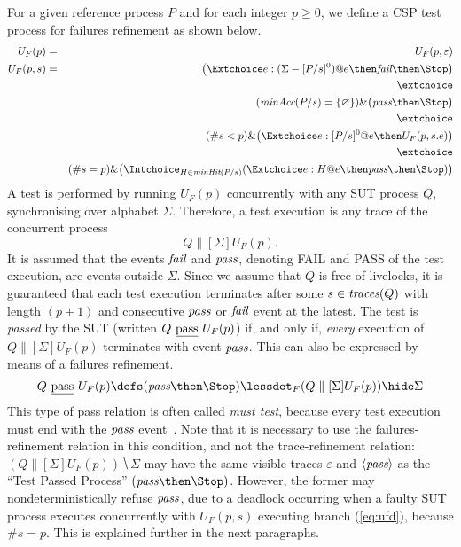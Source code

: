 For a given reference process $P$ and for each integer $p\ge 0$, we define a
CSP test process for failures refinement as shown below.
%
\begin{eqnarray}
U_F(p) & = & U_F(p,\varepsilon)
\\
U_F(p,s) & = & \big( \Extchoice e:(\Sigma - [P/s]^0) @ e \then \efail\then \Stop \big)
\label{eq:ufa}
\\ & & \extchoice \nonumber
\\ & & (\minaccs(P/s) = \{ \varnothing \})    \&   \big( \epass \then \Stop \big)
\label{eq:ufb}
\\ & & \extchoice \nonumber
\\ & & (\#s < p) \& \big( \Extchoice e:[P/s]^0 @ e \then U_F(p,s.e) \big)
\label{eq:ufc}
\\ & & \extchoice \nonumber
\\ & & (\#s = p ) \& \big( \Intchoice_{H\in\minhits(P/s)} ( \Extchoice e:H @ e \then \epass \then\Stop   )  \big)
\label{eq:ufd}
\end{eqnarray}
%
A test is performed by running $U_F(p)$ concurrently with any SUT process $Q$,
synchronising over alphabet $\Sigma$. Therefore, a test execution is any
trace of the concurrent process
\[
Q\parallel[\Sigma] U_F(p).
\]
It is assumed that the events ${\text{\it fail}}$ and ${\text{\it pass}}$, denoting FAIL and PASS
of the test execution, are events outside $\Sigma$. Since we assume that $Q$
is free of livelocks, it is guaranteed that each test execution terminates
after some $s\in\text{\it traces}(Q)$ with length $(p+1)$ and consecutive ${\text{\it pass}}$ or ${\text{\it fail}}$ event at the latest. The test is
\emph{passed} by the SUT (written $Q\ \pass\ U_F(p)$) if, and only if, {\it
every} execution of $Q\parallel[\Sigma] U_F(p)$ terminates with   event
${\text{\it pass}}$. This can also be  expressed by means of a failures refinement.
\[
Q\ \pass\ U_F(p) \defs (\epass\then\Stop) \lessdet_F (Q\parallel[\Sigma] U_F(p)) \hide \Sigma
\]
This type of pass relation is often called \emph{must test}, because every
test execution must end with the ${\text{\it pass}}$
event~\cite{Hennessy:1988:ATP:50497}. Note that it is necessary to use the
failures-refinement relation in this condition, and not the trace-refinement
relation:~$(Q\parallel[\Sigma] U_F(p)) \hide \Sigma$ may have  the same
visible traces $\varepsilon$ and $\langle {\text{\it pass}}\rangle$ as the ``Test Passed
Process'' $(\epass\then\Stop)$. However, the former may nondeterministically
refuse ${\text{\it pass}}$, due to a deadlock occurring when a faulty SUT process
executes concurrently with $U_F(p,s)$ executing branch (\ref{eq:ufd}),
because $\#s = p$. This is explained further in the next paragraphs.

